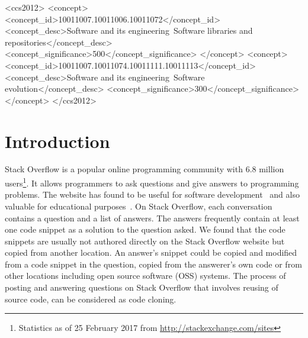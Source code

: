 \documentclass[sigconf,review, anonymous]{acmart}
\begin{document}
\begin{CCSXML}
	<ccs2012>
	<concept>
	<concept_id>10011007.10011006.10011072</concept_id>
	<concept_desc>Software and its engineering~Software libraries and repositories</concept_desc>
	<concept_significance>500</concept_significance>
	</concept>
	<concept>
	<concept_id>10011007.10011074.10011111.10011113</concept_id>
	<concept_desc>Software and its engineering~Software evolution</concept_desc>
	<concept_significance>300</concept_significance>
	</concept>
	</ccs2012>
\end{CCSXML}



	
\maketitle

\section{Introduction}

Stack Overflow is a popular online programming community with 6.8
million users\footnote{Statistics as of 25 February 2017 from \url{http://stackexchange.com/sites}}. It allows programmers to ask questions and give answers
to programming problems. The website has found to be useful for
software
development~\cite{Ponzanelli2013,Ponzanelli2014,Keivanloo2014,Park2014,
  Stolee2014,Subramanian2013,Diamantopoulos2015,Treude2016} and also
valuable for educational purposes~\cite{Nasehi2012}. On Stack
Overflow, each conversation contains a question and a list of
answers. The answers frequently contain at least one code snippet as
a solution to the question asked. We found that the code snippets are
usually not authored directly on the Stack Overflow website but copied
from another location. An answer's snippet could be copied and modified
from a code snippet in the question, copied from the answerer's own
code or from other locations including open source software (OSS)
systems. The process of posting and answering questions on Stack
Overflow that involves reusing of source code, can be considered as
code cloning.
\end{document}
